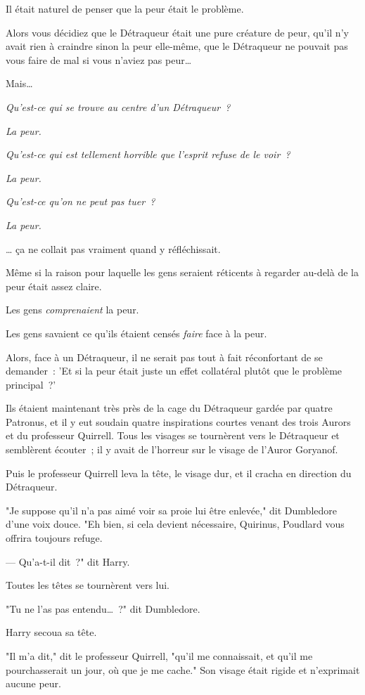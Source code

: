 Il était naturel de penser que la peur était le problème.

Alors vous décidiez que le Détraqueur était une pure créature de peur, qu'il n'y avait rien à craindre sinon la peur elle-même, que le Détraqueur ne pouvait pas vous faire de mal si vous n'aviez pas peur…

Mais…

\emph{Qu'est-ce qui se trouve au centre d'un Détraqueur~?}

\emph{La peur.}

\emph{Qu'est-ce qui est tellement horrible que l'esprit refuse de le voir~?}

\emph{La peur.}

\emph{Qu'est-ce qu'on ne peut pas tuer~?}

\emph{La peur.}

… ça ne collait pas vraiment quand y réfléchissait.

Même si la raison pour laquelle les gens seraient réticents à regarder au-delà de la peur était assez claire.

Les gens \emph{comprenaient} la peur.

Les gens savaient ce qu'ils étaient censés \emph{faire} face à la peur.

Alors, face à un Détraqueur, il ne serait pas tout à fait réconfortant de se demander~: 'Et si la peur était juste un effet collatéral plutôt que le problème principal~?'

Ils étaient maintenant très près de la cage du Détraqueur gardée par quatre Patronus, et il y eut soudain quatre inspirations courtes venant des trois Aurors et du professeur Quirrell. Tous les visages se tournèrent vers le Détraqueur et semblèrent écouter~; il y avait de l'horreur sur le visage de l'Auror Goryanof.

Puis le professeur Quirrell leva la tête, le visage dur, et il cracha en direction du Détraqueur.

"Je suppose qu'il n'a pas aimé voir sa proie lui être enlevée," dit Dumbledore d'une voix douce. "Eh bien, si cela devient nécessaire, Quirinus, Poudlard vous offrira toujours refuge.

--- Qu'a-t-il dit~?" dit Harry.

Toutes les têtes se tournèrent vers lui.

"Tu ne l'as pas entendu…~?" dit Dumbledore.

Harry secoua sa tête.

"Il m'a dit," dit le professeur Quirrell, "qu'il me connaissait, et qu'il me pourchasserait un jour, où que je me cache." Son visage était rigide et n'exprimait aucune peur.

